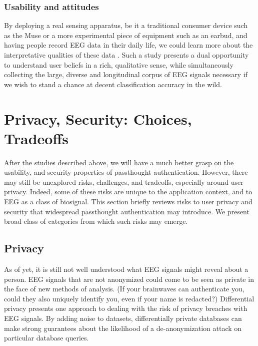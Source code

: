 \documentclass[sigconf]{acmart}
\begin{document}
\subsubsection{Usability and attitudes}
\label{sec:orgd44d815}

By deploying a real sensing apparatus, be it a traditional consumer device such as the Muse \cite{Mihajlovic2015} 
or a more experimental piece of equipment such as an earbud,
and having people record EEG data in their daily life, we could learn more about the interpretative qualities of these data \cite{NafusDawn;Sherman2014}.
Such a study presents a dual opportunity to understand user beliefs in a rich, qualitative sense, while simultaneously collecting the large, diverse and longitudinal corpus of EEG signals necessary if we wish to stand a chance at decent classification accuracy in the wild.

\section{Privacy, Security: Choices, Tradeoffs}
\label{sec:org7e5111c}

After the studies described above, 
we will have a much better grasp on the usability, and security properties of passthought authentication.
However, there may still be unexplored risks, challenges, and tradeoffs,
especially around user privacy.
Indeed, some of these risks are unique to the application context, and to EEG as a class of biosignal. 
This section briefly reviews risks to user privacy and security that widespread passthought authentication may introduce. 
We present broad class of categories from which such risks may emerge. 

\subsection{Privacy}
\label{sec:org8a9010b}
As of yet, it is still not well understood what EEG signals might reveal about a person.
EEG signals that are not anonymized could come to be seen as private in the face of new methods of analysis.
(If your brainwaves can authenticate you, could they also uniquely identify you, even if your name is redacted?)
Differential privacy \cite{Dwork2014} presents one approach to dealing with the risk of privacy breaches with EEG signals.
By adding noise to datasets, differentially private databases can make strong guarantees about the likelihood of a de-anonymization attack on particular database queries.
\end{document}
